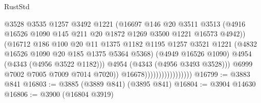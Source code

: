 \begin{lexlean}{RustStd}
\begin{coremodule}
                                            @3528
                                            @3535
                                            @1257
                                            @3492
                                            @1221
                                            (@16697
                                              @146
                                              @20
                                              @3511
                                              @3513
                                              (@4916
                                                @16526
                                                @1090
                                                @145
                                                @211
                                                @20
                                                @1872
                                                @1269
                                                @3500
                                                @1221
                                                @16573
                                                @4942))
                                            (@16712
                                              @186
                                              @100
                                              @20
                                              @11
                                              @1375
                                              @1182
                                              @1195
                                              @1257
                                              @3521
                                              @1221
                                              (@4832 @16526 @1090 @20 @185 @1375 @5364 @5368)
                                              (@4949 @16526 @1090)
                                              @4954
                                              (@4343 (@4956 @3522 @1182)))
                                            @4954
                                            (@4343 (@4956 @3493 @3528)))
                                          @6999
                                          @7002
                                          @7005
                                          @7009
                                          @7014
                                          @7020))
                                      @16678)))))))))))))))))
@16799 := @3883 @841
@16803 := @3885 (@3889 @841) (@3895 @841)
@16804 := @3904 @14630
@16806 := @3900 (@16804 @3919)

\end{coremodule}
\end{lexlean}
